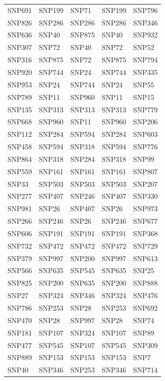 \begin{table}[ht]
\begin{tabular}{lllll}
  SNP691 & SNP199 & SNP71 & SNP199 & SNP796 \\ 
  SNP826 & SNP286 & SNP286 & SNP286 & SNP346 \\ 
  SNP636 & SNP40 & SNP875 & SNP40 & SNP932 \\ 
  SNP307 & SNP72 & SNP40 & SNP72 & SNP52 \\ 
  SNP316 & SNP875 & SNP72 & SNP875 & SNP794 \\ 
  SNP920 & SNP744 & SNP24 & SNP744 & SNP335 \\ 
  SNP953 & SNP24 & SNP744 & SNP24 & SNP55 \\ 
  SNP789 & SNP11 & SNP960 & SNP11 & SNP15 \\ 
  SNP135 & SNP313 & SNP313 & SNP313 & SNP779 \\ 
  SNP668 & SNP960 & SNP11 & SNP960 & SNP206 \\ 
  SNP112 & SNP284 & SNP594 & SNP284 & SNP603 \\ 
  SNP458 & SNP594 & SNP318 & SNP594 & SNP776 \\ 
  SNP864 & SNP318 & SNP284 & SNP318 & SNP99 \\ 
  SNP559 & SNP161 & SNP161 & SNP161 & SNP807 \\ 
  SNP33 & SNP503 & SNP503 & SNP503 & SNP207 \\ 
  SNP277 & SNP407 & SNP246 & SNP407 & SNP330 \\ 
  SNP981 & SNP26 & SNP407 & SNP26 & SNP973 \\ 
  SNP266 & SNP246 & SNP26 & SNP246 & SNP677 \\ 
  SNP606 & SNP191 & SNP191 & SNP191 & SNP368 \\ 
  SNP732 & SNP472 & SNP472 & SNP472 & SNP729 \\ 
  SNP379 & SNP997 & SNP200 & SNP997 & SNP613 \\ 
  SNP566 & SNP635 & SNP545 & SNP635 & SNP25 \\ 
  SNP825 & SNP200 & SNP635 & SNP200 & SNP888 \\ 
  SNP27 & SNP324 & SNP346 & SNP324 & SNP476 \\ 
  SNP786 & SNP253 & SNP28 & SNP253 & SNP692 \\ 
  SNP470 & SNP28 & SNP997 & SNP28 & SNP74 \\ 
  SNP181 & SNP107 & SNP324 & SNP107 & SNP89 \\ 
  SNP477 & SNP545 & SNP107 & SNP545 & SNP309 \\ 
  SNP889 & SNP153 & SNP153 & SNP153 & SNP7 \\ 
  SNP40 & SNP346 & SNP253 & SNP346 & SNP714 \\ 

\end{tabular}
\end{table}
